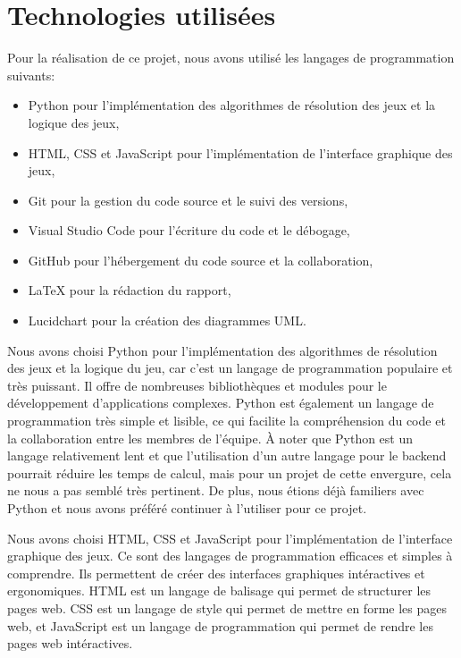 \section{Technologies utilisées}

Pour la réalisation de ce projet, nous avons utilisé les langages de programmation suivants:
\begin{itemize}
	\item Python pour l'implémentation des algorithmes de résolution des jeux et la logique des jeux,
	\item HTML, CSS et JavaScript pour l'implémentation de l'interface graphique des jeux,
	\item Git pour la gestion du code source et le suivi des versions,
	\item Visual Studio Code pour l'écriture du code et le débogage,
	\item GitHub pour l'hébergement du code source et la collaboration,
	\item LaTeX pour la rédaction du rapport,
	\item Lucidchart pour la création des diagrammes UML.\@
\end{itemize}

Nous avons choisi Python pour l'implémentation des algorithmes de résolution des 
jeux et la logique du jeu, car c'est un langage de programmation populaire et 
très puissant. Il offre de nombreuses bibliothèques et modules pour le 
développement d'applications complexes. 
Python est également un langage de programmation très simple et lisible, 
ce qui facilite la compréhension du code et la collaboration entre les membres de 
l'équipe.
À noter que Python est un langage relativement lent et que l'utilisation d'un autre
langage pour le backend pourrait réduire les temps de calcul, mais pour un projet de cette envergure,
cela ne nous a pas semblé très pertinent. De plus, nous étions déjà familiers avec Python
et nous avons préféré continuer à l'utiliser pour ce projet.

Nous avons choisi HTML, CSS et JavaScript pour l'implémentation de l'interface
graphique des jeux. Ce sont des langages de programmation efficaces et 
simples à comprendre. Ils permettent de créer des interfaces graphiques intéractives 
et ergonomiques. HTML est un langage de balisage qui permet de structurer les pages
web. CSS est un langage de style qui permet de mettre en forme les pages web, et
JavaScript est un langage de programmation qui permet de rendre les pages web
intéractives.

